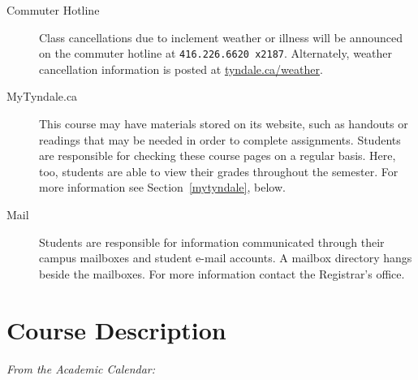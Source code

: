 \begin{titlepage}
\begin{center}
    \begin{description}
      \item[Commuter Hotline]
        Class cancellations due to inclement weather or illness will
        be announced on the commuter hotline at \texttt{416.226.6620
        x2187}. Alternately, weather cancellation information is posted
        at \href{http://tyndale.ca/weather}{tyndale.ca/weather}.
      \item[MyTyndale.ca]
        This course may have materials stored on its website, such as
        handouts or readings that may be needed in order to complete
        assignments. Students are responsible for checking these course
        pages on a regular basis. Here, too, students are able to view
        their grades throughout the semester. For more information see
        Section~\ref{mytyndale}, below.
      \item[Mail]
        Students are responsible for information communicated through
        their campus mailboxes and student e-mail accounts. A mailbox
        directory hangs beside the mailboxes. For more information
        contact the Registrar's office.
    \end{description}

  \end{center}

  \section{Course Description}
  \label{description}

  \emph{From the Academic Calendar:} \cdescription

\end{titlepage}
\setcounter{page}{2} %
